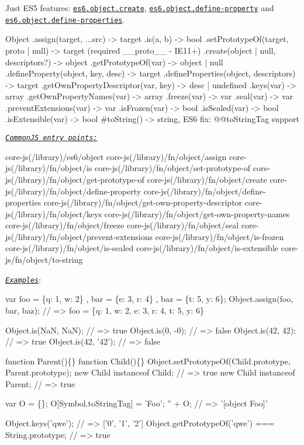 Just E\+S5 features\+: \href{https://github.com/zloirock/core-js/blob/v2.6.0/modules/es6.object.create.js}{\tt {\ttfamily es6.\+object.\+create}}, \href{https://github.com/zloirock/core-js/blob/v2.6.0/modules/es6.object.define-property.js}{\tt {\ttfamily es6.\+object.\+define-\/property}} and \href{https://github.com/zloirock/core-js/blob/v2.6.0/modules/es6.object.es6.object.define-properties.js}{\tt {\ttfamily es6.\+object.\+define-\/properties}}. 
\begin{DoxyCode}
Object
  .assign(target, ...src)                -> target
  .is(a, b)                              -> bool
  .setPrototypeOf(target, proto | null)  -> target (required \_\_proto\_\_ - IE11+)
  .create(object | null, descriptors?)   -> object
  .getPrototypeOf(var)                   -> object | null
  .defineProperty(object, key, desc)     -> target
  .defineProperties(object, descriptors) -> target
  .getOwnPropertyDescriptor(var, key)    -> desc | undefined
  .keys(var)                             -> array
  .getOwnPropertyNames(var)              -> array
  .freeze(var)                           -> var
  .seal(var)                             -> var
  .preventExtensions(var)                -> var
  .isFrozen(var)                         -> bool
  .isSealed(var)                         -> bool
  .isExtensible(var)                     -> bool
  #toString()                            -> string, ES6 fix: @@toStringTag support
\end{DoxyCode}
 \href{#commonjs}{\tt {\itshape Common\+JS entry points\+:}} 
\begin{DoxyCode}
core-js(/library)/es6/object
core-js(/library)/fn/object/assign
core-js(/library)/fn/object/is
core-js(/library)/fn/object/set-prototype-of
core-js(/library)/fn/object/get-prototype-of
core-js(/library)/fn/object/create
core-js(/library)/fn/object/define-property
core-js(/library)/fn/object/define-properties
core-js(/library)/fn/object/get-own-property-descriptor
core-js(/library)/fn/object/keys
core-js(/library)/fn/object/get-own-property-names
core-js(/library)/fn/object/freeze
core-js(/library)/fn/object/seal
core-js(/library)/fn/object/prevent-extensions
core-js(/library)/fn/object/is-frozen
core-js(/library)/fn/object/is-sealed
core-js(/library)/fn/object/is-extensible
core-js/fn/object/to-string
\end{DoxyCode}
 \href{http://goo.gl/ywdwPz}{\tt {\itshape Examples}}\+: 
\begin{DoxyCode}
var foo = \{q: 1, w: 2\}
  , bar = \{e: 3, r: 4\}
  , baz = \{t: 5, y: 6\};
Object.assign(foo, bar, baz); // => foo = \{q: 1, w: 2, e: 3, r: 4, t: 5, y: 6\}

Object.is(NaN, NaN); // => true
Object.is(0, -0);    // => false
Object.is(42, 42);   // => true
Object.is(42, '42'); // => false

function Parent()\{\}
function Child()\{\}
Object.setPrototypeOf(Child.prototype, Parent.prototype);
new Child instanceof Child;  // => true
new Child instanceof Parent; // => true

var O = \{\};
O[Symbol.toStringTag] = 'Foo';
'' + O; // => '[object Foo]'

Object.keys('qwe'); // => ['0', '1', '2']
Object.getPrototypeOf('qwe') === String.prototype; // => true
\end{DoxyCode}
